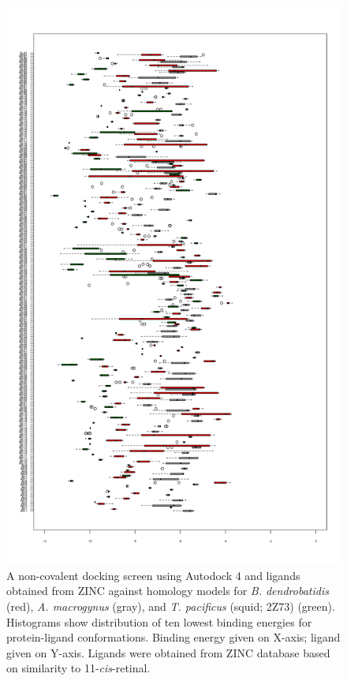 \begin{figure}[htbp]
  \includegraphics[]{./Chapter_RhodStruct/img/dockPlot.png}
  \caption[Docking screen for \textit{Bd} and \textit{Am} models]{A non-covalent docking screen using Autodock 4 and ligands obtained from ZINC against homology models for \textit{B. dendrobatidis} (red), \textit{A. macrogynus} (gray), and \textit{T. pacificus} (squid; 2Z73) (green). Histograms show distribution of ten lowest binding energies for protein-ligand conformations. Binding energy given on X-axis; ligand given on Y-axis. Ligands were obtained from ZINC database based on similarity to 11-\textit{cis}-retinal.}
  \label{fig:ChRhodS_NonCovDock}
\end{figure}

